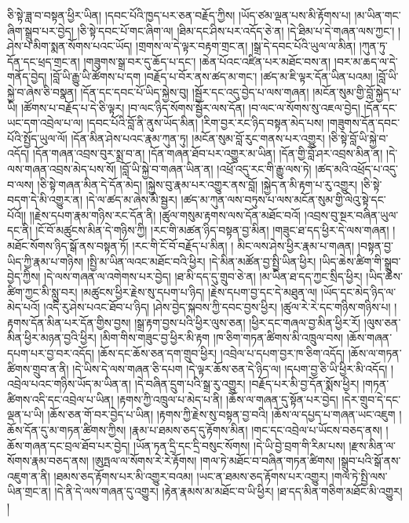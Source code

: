 ཅི་སྟེ་ཟླ་བ་བསྟན་ཕྱིར་ཡིན། །དབང་པོའི་ཁྱད་པར་ཅན་བརྗོད་ཀྱིས། །ཡོད་ཙམ་ལྡན་པས་མི་རྟོགས་པ། །མ་ཡིན་གང་ཞིག་སྒྲུབ་པར་བྱེད། །ཅི་སྟེ་དབང་པོ་གང་ཞིག་ལ། །ཐིམ་དང་ཤིས་པར་འདོད་ཅེ་ན། །དེ་ཐིམ་པ་དེ་གཞན་ལས་ཀྱང་། །ཤེས་པ་མིག་སྨན་སོགས་པའང་ཡོད། །གྲགས་ལ་དེ་ལྟར་བརྟག་གྲང་ན། །སྒྲ་དེ་དབང་པོའི་ཡུལ་ལ་མིན། །ཀུན་ཏུ་དོན་དང་ཕྲད་གྲང་ན། །གཟུགས་སྒྲ་བར་དུ་ཆོད་པ་དང་། །ཆེན་པོའང་འཛིན་པར་མཐོང་བས་ན། །བར་མ་ཆད་ལ་དེ་གནོད་བྱེད། །བློ་ཡི་རྒྱུ་ཡི་ཚོགས་པ་དག །བརྗོད་པ་བོར་ནས་ཚད་མ་གང་། །ཚད་མ་ཇི་ལྟར་དོན་ཡིན་པའམ། །བློ་ཡི་སྐྱེ་བ་ཞེས་ཅི་བསྣན། །དོན་དང་དབང་པོ་ཡིད་སྐྱེས་བུ། །སྦྱོར་དང་འདུ་བྱེད་པ་ལས་གཞན། །མངོན་སུམ་གྱི་བློ་སྐྱེད་པ་ཡི། །ཚོགས་པ་བརྗོད་པ་དེ་ཅི་ལྟར། །བ་ལང་ཉིད་སོགས་སྦྱོར་ལས་དོན། །བ་ལང་ལ་སོགས་སུ་འཇལ་བྱེད། །དོན་དང་ཡང་དག་འབྲེལ་པ་ལ། །དབང་པོའི་བློ་ནི་ནུས་ཡོད་མིན། །རིག་བྱར་རང་ཉིད་བསྟན་མེད་པས། །གཟུགས་དོན་དབང་པོའི་སྤྱོད་ཡུལ་ལོ། །དོན་མིན་ཤེས་པའང་རྣམ་ཀུན་ཏུ། །མངོན་སུམ་བློ་རུང་གནས་པར་འགྱུར། །ཅི་སྟེ་བློ་ཡི་སྐྱེ་བ་འདོད། །དོན་གཞན་འབྲས་བུར་སྨྲ་བ་ན། །དོན་གཞན་ཐོབ་པར་འགྱུར་མ་ཡིན། །དོན་གྱི་བློ་ཤར་འབྲས་མིན་ན། །དེ་ལས་གཞན་འབྲས་མེད་པས་སོ། །བློ་ཡི་སྐྱེ་བ་གཞན་ཡིན་ན། །འཕྲོ་འདུ་རང་གི་རྒྱུ་ལས་ཏེ། །ཚད་མའི་འཕྲོད་པ་འདུ་བ་ལས། །ཅི་སྟེ་གཞན་མིན་དེ་དོན་མེད། །སྐྱེས་བུ་རྣམ་པར་འགྱུར་ནས་བློ། །སྐྱེད་ན་མི་རྟག་པ་རུ་འགྱུར། །ཅི་སྟེ་བདག་དེ་མི་འགྱུར་ན། །དེ་ལ་ཚད་མ་ཞེས་མི་སྦྱར། །ཚད་མ་ཀུན་ལས་བཏུས་པ་ལས་མངོན་སུམ་གྱི་ལེའུ་སྟེ་དང་པོའོ།། །།རྗེས་དཔག་རྣམ་གཉིས་རང་དོན་ནི། །ཚུལ་གསུམ་རྟགས་ལས་དོན་མཐོང་བའོ། །འབྲས་བུ་སྔར་བཞིན་ཡུལ་དང་ནི། །ངོ་བོ་མཚུངས་མིན་དེ་གཉིས་ཀྱི། །རང་གི་མཚན་ཉིད་བསྟན་བྱ་མིན། །གཟུང་ཐ་དད་ཕྱིར་དེ་ལས་གཞན། །མཐོང་སོགས་ཉིད་སྒོ་ནས་བསྟན་ཏོ། །རང་གི་ངོ་བོ་བརྗོད་པ་མིན། །
མིང་ལས་ཤེས་ཕྱིར་རྣམ་པ་གཞན། །བསྟན་བྱ་ཡིད་ཀྱི་རྣམ་པ་གཉིས། །སྤྱི་མ་ཡིན་ལའང་མཐོང་བའི་ཕྱིར། །དེ་མིན་མཚོན་བྱ་སྤྱི་ཡིན་ཕྱིར། །ཡིད་ཆེས་ཚིག་གི་སྒྲུབ་བྱེད་ཀྱིས། །དེ་ལས་གཞན་ལ་འགེགས་པར་བྱེད། །ཐ་མི་དད་དུ་གྲུབ་ཅེ་ན། །མ་ཡིན་ཐ་དད་ཀྱང་སྲིད་ཕྱིར། །ཡིད་ཆེས་ཚིག་ཀྱང་མི་སླུ་བར། །མཚུངས་ཕྱིར་རྗེས་སུ་དཔག་པ་ཉིད། །རྗེས་དཔག་བྱ་དང་དེ་མཐུན་ལ། །ཡོད་དང་མེད་ཉིད་ལ་མེད་པའོ། །འདི་རུ་ཤེས་པའང་ཐོབ་པ་ཉིད། །ཤེས་བྱེད་སྐབས་ཀྱི་དབང་བྱས་ཕྱིར། །ཚུལ་རེ་རེ་དང་གཉིས་གཉིས་པ། །རྟགས་དོན་མིན་པར་དོན་གྱིས་བྱས། །སྒྲ་རྟག་བྱས་པའི་ཕྱིར་ལུས་ཅན། །ཕྱིར་དང་གཞལ་བྱ་མིན་ཕྱིར་རོ། །ལུས་ཅན་མིན་ཕྱིར་མཉན་བྱའི་ཕྱིར། །མིག་གིས་གཟུང་བྱ་ཕྱིར་མི་རྟག །ཁ་ཅིག་གཏན་ཚིགས་མི་འཁྲུལ་བས། །ཆོས་གཞན་དཔག་པར་བྱ་བར་འདོད། །ཆོས་དང་ཆོས་ཅན་དག་གྲུབ་ཕྱིར། །འབྲེལ་པ་དཔག་བྱར་ཁ་ཅིག་འདོད། །ཆོས་ལ་གཏན་ཚིགས་གྲུབ་ན་ནི། །དེ་ཡིས་དེ་ལས་གཞན་ཅི་དཔག །དེ་ལྟར་ཆོས་ཅན་དེ་ཉིད་ལ། །དཔག་བྱ་ཅི་ཡི་ཕྱིར་མི་འདོད། །འབྲེལ་པའང་གཉིས་ཡོད་མ་ཡིན་ན། །དེ་བཞིན་དྲུག་པའི་སྒྲ་རུ་འགྱུར། །བརྗོད་པར་མི་བྱ་དོན་སྨོས་ཕྱིར། །གཏན་ཚིགས་འདི་དང་འབྲེལ་པ་ཡིན། །རྟགས་ཀྱི་འཁྲུལ་པ་མེད་པ་ནི། །ཆོས་ལ་གཞན་དུ་སྟོན་པར་བྱེད། །དེར་གྲུབ་དེ་དང་ལྡན་པ་ཡི། །ཆོས་ཅན་གོ་བར་བྱེད་པ་ཡིན། །རྟགས་ཀྱི་རྗེས་སུ་བསྟན་བྱ་བའི། །ཆོས་ལ་དཔྱད་པ་གཞན་ཡང་འཇུག །ཆོས་དོན་དུ་མ་གཏན་ཚིགས་ཀྱིས། །རྣམ་པ་ཐམས་ཅད་དུ་རྟོགས་མིན། །གང་དང་འབྲེལ་པ་ཡོངས་བཅད་ནས། །ཆོས་གཞན་དང་བྲལ་ཐོབ་པར་བྱེད། །ཡོན་ཏན་དྲི་དང་དྲི་བསུང་སོགས། །དེ་ཡི་བྱེ་བྲག་གི་རིམ་པས། །རྫས་མིན་ལ་སོགས་རྣམ་བཅད་ནས། །ཨུཏྤལ་ལ་སོགས་རེ་རེ་རྟོགས། །གལ་ཏེ་མཐོང་བ་བཞིན་གཏན་ཚིགས། །སྒྲུབ་པའི་སྒོ་ནས་འཇུག་ན་ནི། །ཐམས་ཅད་རྟོགས་པར་མི་འགྱུར་བའམ། །ཡང་ན་ཐམས་ཅད་རྟོགས་པར་འགྱུར། །གལ་ཏེ་སྤྱི་ལས་ཡིན་གྲང་ན། །དེ་ནི་དེ་ལས་གཞན་དུ་འགྱུར། །རྟེན་རྣམས་མ་མཐོང་བ་ཡི་ཕྱིར། །ཐ་དད་མིན་གཅིག་མཐོང་མི་འགྱུར། །

